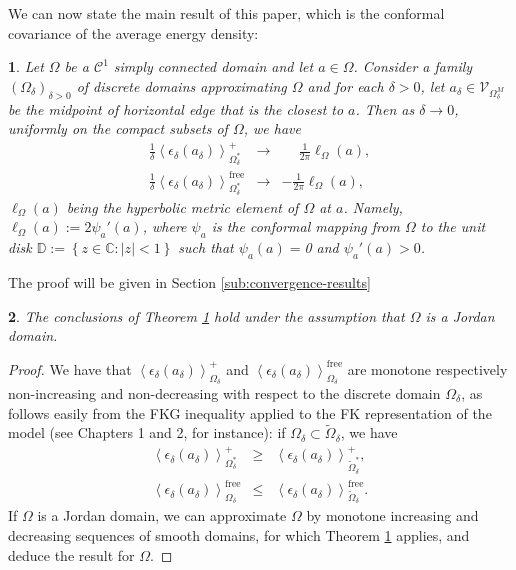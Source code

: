 \documentclass[oneside,english]{amsart}
\numberwithin{equation}{section}
\numberwithin{figure}{section}
\theoremstyle{plain}
\theoremstyle{plain}
\newtheorem{thm}{\protect\theoremname}
\theoremstyle{plain}
\newtheorem{cor}[thm]{\protect\corollaryname}
\theoremstyle{plain}
\theoremstyle{plain}
\theoremstyle{definition}
\theoremstyle{remark}
\providecommand{\corollaryname}{Corollary}
\providecommand{\theoremname}{Theorem}
\providecommand{\theoremname}{Theorem}
\begin{document}
We can now state the main result of this paper, which is the conformal
covariance of the average energy density:
\begin{thm}
\label{thm:main-thm}Let $\Omega$ be a $\mathcal{C}^{1}$ simply
connected domain and let $a\in\Omega$. Consider a family $\left(\Omega_{\delta}\right)_{\delta>0}$
of discrete domains approximating $\Omega$ and for each $\delta>0$,
let $a_{\delta}\in\mathcal{V}_{\Omega_{\delta}^{M}}$ be the midpoint
of horizontal edge that is the closest to $a$. Then as $\delta\to0$,
uniformly on the compact subsets of $\Omega$, we have
\begin{eqnarray*}
\frac{1}{\delta}\left\langle \epsilon_{\delta}\left(a_{\delta}\right)\right\rangle _{\Omega_{\delta}^{*}}^{+} & \to & \phantom{-}\frac{1}{2\pi}\ell_{\Omega}\left(a\right),\\
\frac{1}{\delta}\left\langle \epsilon_{\delta}\left(a_{\delta}\right)\right\rangle _{\Omega_{\delta}^{*}}^{\mathrm{free}} & \to & -\frac{1}{2\pi}\ell_{\Omega}\left(a\right),
\end{eqnarray*}
$\ell_{\Omega}\left(a\right)$ being the hyperbolic metric element
of $\Omega$ at $a$. Namely, $\ell_{\Omega}\left(a\right):=2\psi_{a}'\left(a\right)$,
where $\psi_{a}$ is the conformal mapping from $\Omega$ to the unit
disk $\mathbb{D}:=\left\{ z\in\mathbb{C}:\left|z\right|<1\right\} $
such that $\psi_{a}\left(a\right)=$0 and $\psi_{a}'\left(a\right)>0$. 
\end{thm}
The proof will be given in Section \ref{sub:convergence-results}
\begin{cor}
The conclusions of Theorem \ref{thm:main-thm} hold under the assumption
that $\Omega$ is a Jordan domain.\end{cor}
\begin{proof}
We have that $\left\langle \epsilon_{\delta}\left(a_{\delta}\right)\right\rangle _{\Omega_{\delta}}^{+}$
and $\left\langle \epsilon_{\delta}\left(a_{\delta}\right)\right\rangle _{\Omega_{\delta}}^{\mathrm{free}}$
are monotone respectively non-increasing and non-decreasing with respect
to the discrete domain $\Omega_{\delta}$, as follows easily from
the FKG inequality applied to the FK representation of the model (see
\cite{grimmett} Chapters 1 and 2, for instance): if $\Omega_{\delta}\subset\tilde{\Omega}_{\delta}$,
we have
\begin{eqnarray*}
\left\langle \epsilon_{\delta}\left(a_{\delta}\right)\right\rangle _{\Omega_{\delta}^{*}}^{+} & \geq & \left\langle \epsilon_{\delta}\left(a_{\delta}\right)\right\rangle _{\tilde{\Omega}_{\delta}^{*}}^{+},\\
\left\langle \epsilon_{\delta}\left(a_{\delta}\right)\right\rangle _{\Omega_{\delta}}^{\mathrm{free}} & \leq & \left\langle \epsilon_{\delta}\left(a_{\delta}\right)\right\rangle _{\tilde{\Omega}_{\delta}}^{\mathrm{free}}.
\end{eqnarray*}
If $\Omega$ is a Jordan domain, we can approximate $\Omega$ by monotone
increasing and decreasing sequences of smooth domains, for which Theorem
\ref{thm:main-thm} applies, and deduce the result for $\Omega$.
\end{proof}
\end{document}
